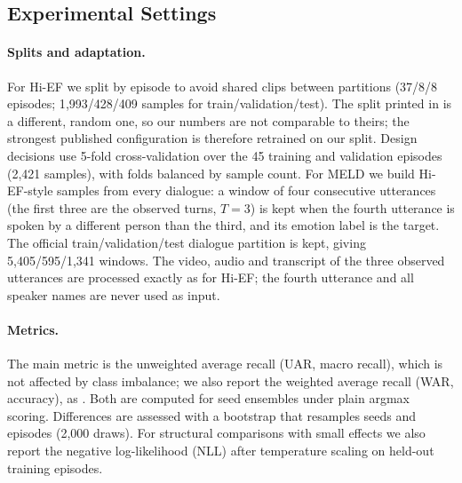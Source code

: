 \documentclass[11pt]{article}
\begin{document}
\subsection{Experimental Settings}
\label{sec:setting}

\paragraph{Splits and adaptation.} For Hi-EF we split by episode to avoid shared clips between partitions
(37/8/8 episodes; 1{,}993/428/409 samples for train/validation/test). The split printed in \citet{wang2026hief} is a
different, random one, so our numbers are not comparable to theirs; the strongest published configuration is therefore
retrained on our split. Design decisions use 5-fold cross-validation over the 45 training and validation episodes
(2{,}421 samples), with folds balanced by sample count. For MELD we build Hi-EF-style samples from every dialogue:
a window of four consecutive utterances (the first three are the observed turns, $T=3$) is kept when the fourth
utterance is spoken by a different person than the third, and its emotion label is the target. The official
train/validation/test dialogue partition is kept, giving 5{,}405/595/1{,}341 windows. The video, audio and transcript
of the three observed utterances are processed exactly as for Hi-EF; the fourth utterance and all speaker names are
never used as input.

\paragraph{Metrics.} The main metric is the unweighted average recall (UAR, macro recall), which is not affected by
class imbalance; we also report the weighted average recall (WAR, accuracy), as \citet{wang2026hief}. Both are computed
for seed ensembles under plain argmax scoring. Differences are assessed with a bootstrap that resamples seeds and
episodes (2{,}000 draws). For structural comparisons with small effects we also report the negative log-likelihood
(NLL) after temperature scaling \citep{guo2017calibration} on held-out training episodes.
\end{document}
